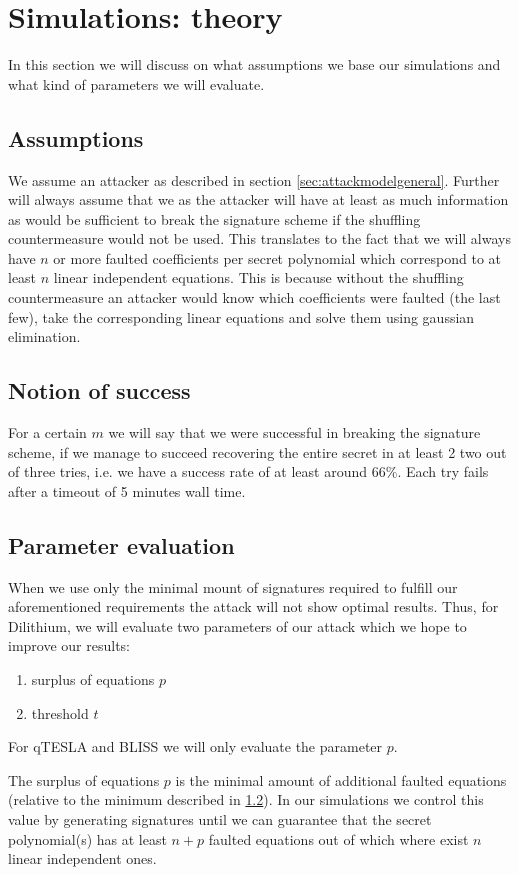 \documentclass[a4paper,titlepage]{article}
\begin{document}
\section{Simulations: theory}
In this section we will discuss on what assumptions we base our simulations and what kind of parameters we will evaluate. 
\subsection{Assumptions}
\label{sec:simassumptions}
We assume an attacker as described in section \ref{sec:attackmodelgeneral}.
Further will always assume that we as the attacker will have at least as much information as would be sufficient to break the signature scheme if the shuffling countermeasure would not be used. This translates to the fact that we will always have $n$ or more faulted coefficients per secret polynomial which correspond to at least $n$ linear independent equations. This is because without the shuffling countermeasure an attacker would know which coefficients were faulted (the last few), take the corresponding linear equations and solve them using gaussian elimination.

\subsection{Notion of success}
\label{sec:simsuccess}
For a certain $m$ we will say that we were successful in breaking the signature scheme, if we manage to succeed recovering the entire secret in at least 2 two out of three tries, i.e. we have a success rate of at least around $66\%$. Each try fails after a timeout of 5 minutes wall time.

\subsection{Parameter evaluation}
When we use only the minimal mount of signatures required to fulfill our aforementioned requirements the attack will not show optimal results.
Thus, for Dilithium, we will evaluate two parameters of our attack which we hope to improve our results:
\begin{enumerate}
	\item surplus of equations $p$
	\item threshold $t$
\end{enumerate}
For qTESLA and BLISS we will only evaluate the parameter $p$. 

The surplus of equations $p$ is the minimal amount of additional faulted equations (relative to the minimum described in  \ref{sec:simsuccess}).
In our simulations we control this value by generating signatures until we can guarantee that the secret polynomial(s) has at least $n + p$ faulted equations out of which where exist $n$ linear independent ones.
\end{document}
